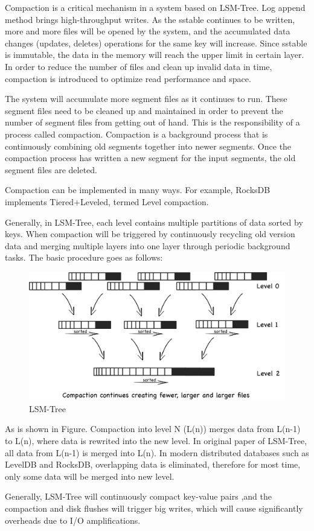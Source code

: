 \documentclass[a4paper,10pt,twoside]{article}
\begin{document}
Compaction is a critical mechanism in a system based on LSM-Tree. 
Log append method brings high-throughput writes. 
As the sstable continues to be written, more and more files will be opened by the system, and the accumulated data changes (updates, deletes) operations for the same key will increase. 
Since sstable is immutable, the data in the memory will reach the upper limit in certain layer.
In order to reduce the number of files and clean up invalid data in time, compaction is introduced to optimize read performance and space.
\par
The system will accumulate more segment files as it continues to run. 
These segment files need to be cleaned up and maintained in order to prevent the number of segment files from getting out of hand. 
This is the responsibility of a process called compaction. 
Compaction is a background process that is continuously combining old segments together into newer segments.
Once the compaction process has written a new segment for the input segments, the old segment files are deleted.
\par
Compaction can be implemented in many ways. For example, RocksDB implements Tiered+Leveled, termed Level compaction\cite{RocksDB_compaction_algo1}. 
\par
Generally, in LSM-Tree, each level contains multiple partitions of data sorted by keys. When  compaction will be triggered by continuously recycling old version data and merging multiple layers into one layer through periodic background tasks.
The basic procedure goes as follows:
\begin{figure}[h]
    \centering
	\includegraphics[scale=0.3]{LSM_Tree1.png}
    \caption{LSM-Tree}
    \label{fig:mesh1}
\end{figure}
\par
As is shown in Figure. Compaction into level N (L(n)) merges data from L(n-1) to L(n), where data is rewrited into the new level. 
In original paper of LSM-Tree, all data from L(n-1) is merged into L(n). 
In modern distributed databases such as LevelDB and RocksDB, overlapping data is eliminated, therefore for most time, only some data will be merged into new level.
\par
Generally, LSM-Tree will continuously compact key-value pairs ,and the compaction and disk flushes will trigger big writes, which will cause significantly overheads due to I/O amplifications.
\end{document}

